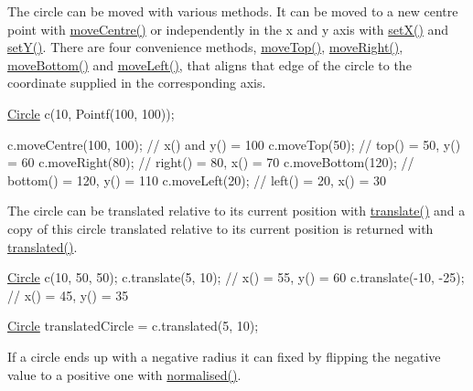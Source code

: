 The circle can be moved with various methods. It can be moved to a new centre point with \hyperlink{classprism_1_1_circle_a1ba209c5aed82199e76427311e4781d2}{move\+Centre()} or independently in the x and y axis with \hyperlink{classprism_1_1_circle_a9f584b9f7d780975557d6293b18cc051}{set\+X()} and \hyperlink{classprism_1_1_circle_add9bf882d06da81faa8063c9a3fec8ae}{set\+Y()}. There are four convenience methods, \hyperlink{classprism_1_1_circle_a6ed1dd2554b297751bb29c22eae26038}{move\+Top()}, \hyperlink{classprism_1_1_circle_ae7d7bbe94f43d61ae8adc764e6cf0e9a}{move\+Right()}, \hyperlink{classprism_1_1_circle_a6392112dd312ec8564596fe00b1e48fa}{move\+Bottom()} and \hyperlink{classprism_1_1_circle_a68a4710fab3752158a149bd9be64f393}{move\+Left()}, that aligns that edge of the circle to the coordinate supplied in the corresponding axis.


\begin{DoxyCode}
\hyperlink{classprism_1_1_circle_aff41793f64e90d15a4d89851b1a6b011}{Circle} c(10, Pointf(100, 100));

c.moveCentre(100, 100); \textcolor{comment}{// x() and y() = 100}
c.moveTop(50);          \textcolor{comment}{// top() = 50, y() = 60}
c.moveRight(80);        \textcolor{comment}{// right() = 80, x() = 70}
c.moveBottom(120);      \textcolor{comment}{// bottom() = 120, y() = 110}
c.moveLeft(20);         \textcolor{comment}{// left() = 20, x() = 30}
\end{DoxyCode}


The circle can be translated relative to its current position with \hyperlink{classprism_1_1_circle_ab11cd4ad2acffd0b55989c32a04a8e2d}{translate()} and a copy of this circle translated relative to its current position is returned with \hyperlink{classprism_1_1_circle_a255dcfc157fc52c83e0cbd9e54a65b89}{translated()}.


\begin{DoxyCode}
\hyperlink{classprism_1_1_circle_aff41793f64e90d15a4d89851b1a6b011}{Circle} c(10, 50, 50);
c.translate(5, 10); \textcolor{comment}{// x() = 55, y() = 60}
c.translate(-10, -25); \textcolor{comment}{// x() = 45, y() = 35}

\hyperlink{classprism_1_1_circle_aff41793f64e90d15a4d89851b1a6b011}{Circle} translatedCircle = c.translated(5, 10);
\end{DoxyCode}


If a circle ends up with a negative radius it can fixed by flipping the negative value to a positive one with \hyperlink{classprism_1_1_circle_a6216b04502cff2b3367d417b1c4b3c5a}{normalised()}.

